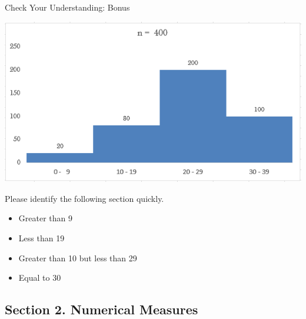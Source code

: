 \documentclass{beamer}
\begin{document}
\begin{frame}{Check Your Understanding: Bonus}
\begin{center}
\includegraphics[scale=0.5]{images/ch2CheckYourUnderstanding1.png}
\end{center}

Please identify the following section quickly. 
\begin{itemize}
\item Greater than 9
\item Less than 19
\item Greater than 10 but less than 29
\item Equal to 30
\end{itemize}

\end{frame}


\subsection{Section 2. Numerical Measures}
\end{document}
